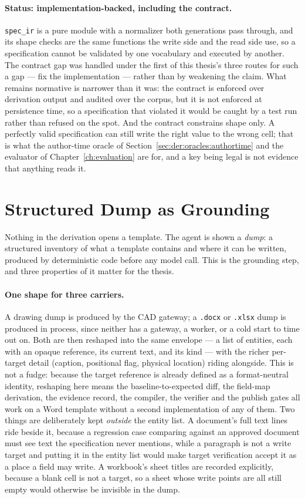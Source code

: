 \paragraph{Status: implementation-backed, including the contract.}
\texttt{spec\_ir} is a pure module with a normalizer both generations pass through, and its
shape checks are the same functions the write side and the read side use, so a specification
cannot be validated by one vocabulary and executed by another. The contract gap was handled
under the first of this thesis's three routes for such a gap --- fix the implementation ---
rather than by weakening the claim. What remains normative is narrower than it was: the
contract is enforced over derivation output and audited over the corpus, but it is not
enforced at persistence time, so a specification that violated it would be caught by a test
run rather than refused on the spot. And the contract constrains shape only. A perfectly
valid specification can still write the right value to the wrong cell; that is what the
author-time oracle of Section~\ref{sec:der:oracles:authortime} and the evaluator of
Chapter~\ref{ch:evaluation} are for, and a key being legal is not evidence that anything
reads it.

\section{Structured Dump as Grounding}
\label{sec:design:dump}

Nothing in the derivation opens a template. The agent is shown a \emph{dump}: a structured
inventory of what a template contains and where it can be written, produced by
deterministic code before any model call. This is the grounding step, and three properties
of it matter for the thesis.

\paragraph{One shape for three carriers.}
A drawing dump is produced by the CAD gateway; a \texttt{.docx} or \texttt{.xlsx} dump is
produced in process, since neither has a gateway, a worker, or a cold start to time out on.
Both are then reshaped into the same envelope --- a list of entities, each with an opaque
reference, its current text, and its kind --- with the richer per-target detail (caption,
positional flag, physical location) riding alongside. This is not a fudge: because the
target reference is already defined as a format-neutral identity, reshaping here means the
baseline-to-expected diff, the field-map derivation, the evidence record, the compiler, the
verifier and the publish gates all work on a Word template without a second implementation
of any of them. Two things are deliberately kept \emph{outside} the entity list. A
document's full text lines ride beside it, because a regression case comparing against an
approved document must see text the specification never mentions, while a paragraph is not
a write target and putting it in the entity list would make target verification accept it as
a place a field may write. A workbook's sheet titles are recorded explicitly, because a
blank cell is not a target, so a sheet whose write points are all still empty would
otherwise be invisible in the dump.

